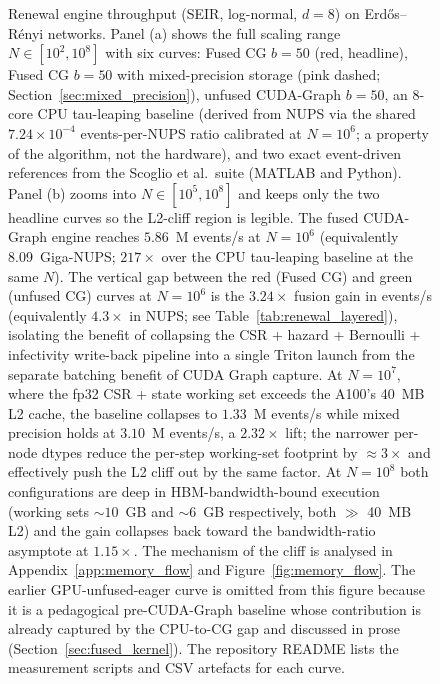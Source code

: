 \begin{figure}[H]
\centering

\caption{Renewal engine throughput (SEIR, log-normal, $d{=}8$) on Erd\H{o}s--R\'{e}nyi networks. Panel (a) shows the full scaling range $N \in [10^2, 10^8]$ with six curves: Fused CG $b{=}50$ (red, headline), Fused CG $b{=}50$ with mixed-precision storage (pink dashed; Section~\ref{sec:mixed_precision}), unfused CUDA-Graph $b{=}50$, an 8-core CPU tau-leaping baseline (derived from NUPS via the shared $7.24 \times 10^{-4}$ events-per-NUPS ratio calibrated at $N=10^6$; a property of the algorithm, not the hardware), and two exact event-driven references from the Scoglio et al.\ suite (MATLAB and Python). Panel (b) zooms into $N \in [10^5, 10^8]$ and keeps only the two headline curves so the L2-cliff region is legible. The fused CUDA-Graph engine reaches $5.86$~M events/s at $N=10^6$ (equivalently 8.09~Giga-NUPS; $217\times$ over the CPU tau-leaping baseline at the same $N$). The vertical gap between the red (Fused CG) and green (unfused CG) curves at $N = 10^6$ is the $3.24\times$ fusion gain in events/s (equivalently $4.3\times$ in NUPS; see Table~\ref{tab:renewal_layered}), isolating the benefit of collapsing the CSR + hazard + Bernoulli + infectivity write-back pipeline into a single Triton launch from the separate batching benefit of CUDA Graph capture. At $N=10^7$, where the fp32 CSR + state working set exceeds the A100's 40~MB L2 cache, the baseline collapses to $1.33$~M events/s while mixed precision holds at $3.10$~M events/s, a $\mathbf{2.32\times}$ lift; the narrower per-node dtypes reduce the per-step working-set footprint by $\approx 3\times$ and effectively push the L2 cliff out by the same factor. At $N=10^8$ both configurations are deep in HBM-bandwidth-bound execution (working sets $\sim 10$~GB and $\sim 6$~GB respectively, both $\gg$ 40~MB L2) and the gain collapses back toward the bandwidth-ratio asymptote at $1.15\times$. The mechanism of the cliff is analysed in Appendix~\ref{app:memory_flow} and Figure~\ref{fig:memory_flow}. The earlier GPU-unfused-eager curve is omitted from this figure because it is a pedagogical pre-CUDA-Graph baseline whose contribution is already captured by the CPU-to-CG gap and discussed in prose (Section~\ref{sec:fused_kernel}). The repository README lists the measurement scripts and CSV artefacts for each curve.}
\label{fig:throughput_renewal}
\end{figure}

